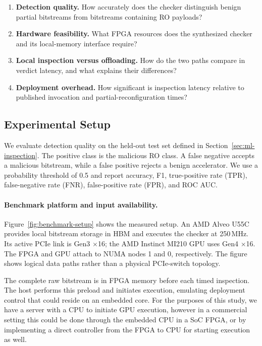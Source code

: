 \documentclass[acmsmall]{acmart}
\begin{document}
\begin{enumerate}
    \item \textbf{Detection quality.} How accurately does the checker
    distinguish benign partial bitstreams from bitstreams containing RO payloads?
    \item \textbf{Hardware feasibility.} What FPGA resources does the
    synthesized checker and its local-memory interface require?
    \item \textbf{Local inspection versus offloading.} How do the two paths
    compare in verdict latency, and what explains their differences?
    \item \textbf{Deployment overhead.} How significant is inspection latency
    relative to published invocation and partial-reconfiguration times?
\end{enumerate}

\subsection{Experimental Setup}
\label{sec:eval-setup}

We evaluate detection quality on the held-out test set defined in
Section~\ref{sec:ml-inspection}. The positive class is the malicious RO class.
A false negative accepts a malicious bitstream, while a false positive rejects
a benign accelerator. We use a probability threshold of 0.5 and report
accuracy, F1, true-positive rate (TPR), false-negative rate (FNR),
false-positive rate (FPR), and ROC AUC.


\paragraph{Benchmark platform and input availability.}
Figure~\ref{fig:benchmark-setup} shows the measured setup. An AMD Alveo U55C
provides local bitstream storage in HBM and executes the checker at 250\,MHz.
Its active PCIe link is Gen3 $\times$16; the AMD Instinct MI210 GPU uses
Gen4 $\times$16. The FPGA and GPU attach to NUMA nodes 1 and 0, respectively.
The figure shows logical data paths rather than a physical PCIe-switch topology.

The complete raw bitstream is in FPGA memory before each timed inspection.
The host performs this preload and initiates execution, emulating deployment
control that could reside on an embedded core. For the purposes of this study,
we have a server with a CPU to initiate GPU execution, however in a commercial 
setting this could be done through the embedded CPU in a SoC FPGA, or by implementing a
direct controller from the FPGA to CPU for starting execution as well. 
\end{document}

